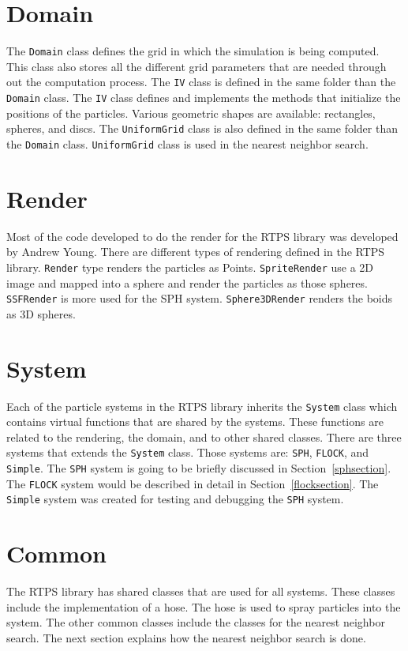 \section{Domain}
The \texttt{Domain} class defines the grid in which the simulation is being computed. This class also stores all the different grid parameters that are needed through out the computation process. The \texttt{IV} class is defined in the same folder than the \texttt{Domain} class. The \texttt{IV} class defines and implements the methods that initialize the positions of the particles. Various geometric shapes are available: rectangles, spheres, and discs. The \texttt{UniformGrid} class is also defined in the same folder than the \texttt{Domain} class. \texttt{UniformGrid} class is used in the nearest neighbor search.

\section{Render}
Most of the code developed to do the render for the RTPS library was developed by Andrew Young\cite{andrewBlog}. There are different types of rendering defined in the RTPS library. \texttt{Render} type renders the particles as Points. \texttt{SpriteRender} use a 2D image and mapped into a sphere and render the particles as those spheres. \texttt{SSFRender} is more used for the SPH system. \texttt{Sphere3DRender} renders the boids as 3D spheres.  

\section{System}
Each of the particle systems in the RTPS library inherits the \texttt{System} class which contains virtual functions that are shared by the systems. These functions are related to the rendering,  the domain, and to other shared classes. There are three systems that extends the \texttt{System} class. Those systems are: \texttt{SPH}, \texttt{FLOCK}, and \texttt{Simple}. The \texttt{SPH} system is going to be briefly discussed in Section~\ref{sphsection}. The \texttt{FLOCK} system would be described in detail in Section~\ref{flocksection}. The \texttt{Simple} system was created for testing and debugging the \texttt{SPH} system.

\section{Common}\label{commonsection}
The RTPS library has shared classes that are used for all systems. These classes include the implementation of a hose. The hose is used to spray particles into the system. The other common classes include the classes for the nearest neighbor search. The next section explains how the nearest neighbor search is done. 

